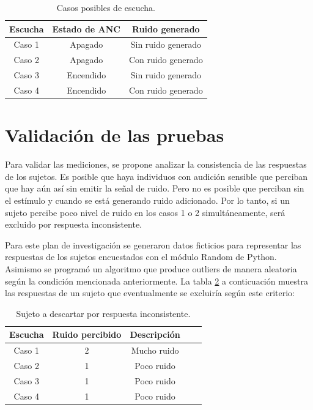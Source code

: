 \documentclass[a4paper,12pt]{article}
\begin{document}
\begin{table}[ht]
\centering
\begin{tabular}{|c|c|c|}
  \hline
  \textbf{Escucha} & \textbf{Estado de ANC} & \textbf{Ruido generado} \\
  \hline
  Caso 1 & Apagado & Sin ruido generado \\
  \hline
  Caso 2 & Apagado & Con ruido generado \\
  \hline
  Caso 3 & Encendido & Sin ruido generado \\
  \hline
  Caso 4 & Encendido & Con ruido generado \\
  \hline
\end{tabular}
\caption{Casos posibles de escucha.}
\label{tab:cases}
\end{table}

\section{Validación de las pruebas}
\label{sec:validation}

Para validar las mediciones, se propone analizar la consistencia de las respuestas de los sujetos.
Es posible que haya individuos con audición sensible que perciban que hay  aún así sin emitir la señal de ruido.
Pero no es posible que perciban  sin el estímulo y  cuando se está generando ruido adicionado.
Por lo tanto, si un sujeto percibe poco nivel de ruido en los casos 1 o 2 simultáneamente, será excluido por respuesta inconsistente.

Para este plan de investigación se generaron datos ficticios para representar las respuestas de los sujetos encuestados con el módulo Random de Python.
Asimismo se programó un algoritmo que produce outliers de manera aleatoria según la condición mencionada anteriormente.
La tabla \ref{tab:outlier} a conticuación muestra las respuestas de un sujeto que eventualmente se excluiría según este criterio:

\begin{table}[ht]
    \centering
    \begin{tabular}{|c|c|c|c|c|}
      \hline
      \textbf{Escucha} & \textbf{Ruido percibido} & \textbf{Descripción} \\
      \hline
      Caso 1 & 2 & Mucho ruido \\
      \hline
      Caso 2 & 1 & Poco ruido \\
      \hline
      Caso 3 & 1 & Poco ruido \\
      \hline
      Caso 4 & 1 & Poco ruido \\
      \hline
\end{tabular}
\caption{Sujeto a descartar por respuesta inconsistente.}
\label{tab:outlier}
\end{table}
\end{document}
